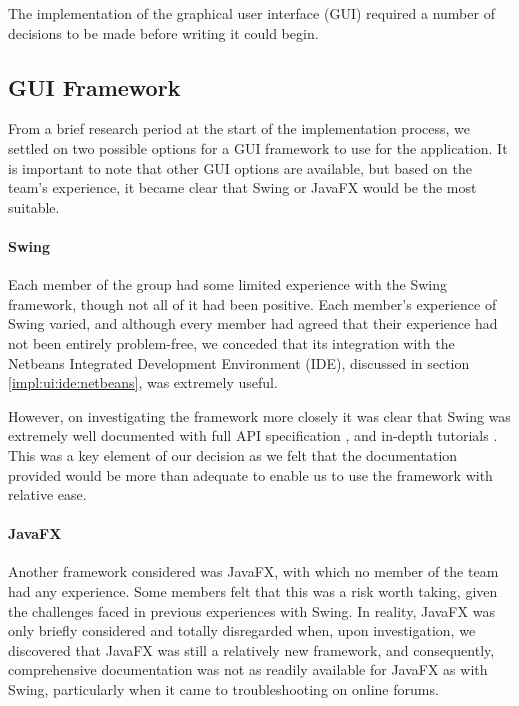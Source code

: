 The implementation of the graphical user interface (GUI) required a number
of decisions to be made before writing it could begin.


\subsection{GUI Framework}
\label{impl:ui:guiframework}

From a brief research period at the start of the implementation 
process, we settled on two possible options for a GUI framework to use
for the application. It is important to note that other GUI options are
available, but based on the team's experience, it became clear that
Swing\cite{swingAPI} or JavaFX\cite{javafxOverview} would be the most
suitable.


\paragraph{Swing}
\label{impl:ui:guiframework:swing}

Each member of the group had some limited experience with the Swing 
framework, though not all of it had been positive.
Each member's experience of Swing varied, and
although every member had agreed that their experience had not been
entirely problem-free, we conceded that its integration with the Netbeans
Integrated Development Environment (IDE), discussed in section
\ref{impl:ui:ide:netbeans}, was extremely useful.

However, on investigating the framework more closely it was clear that
Swing was extremely well documented with full API specification
\cite{swingAPI}, and in-depth tutorials \cite{swingTutorial}.
This was a key element of our decision as we felt that the documentation
provided would be more than adequate to enable us to use the framework
with relative ease.


\paragraph{JavaFX}
\label{impl:ui:guiframework:javafx}

Another framework considered was JavaFX, with which no member of the team
had any experience. 
Some members felt that this was a risk worth taking, given the challenges
faced in previous experiences with Swing.
In reality, JavaFX was only briefly considered and totally disregarded
when, upon investigation, we discovered that JavaFX was still a relatively
new framework, and consequently, comprehensive documentation was not as
readily available for JavaFX as with Swing, particularly when it came 
to troubleshooting on online forums.

